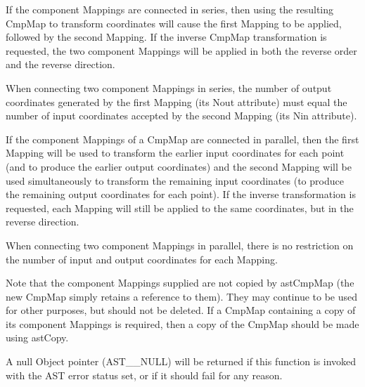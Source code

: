 \documentclass[twoside,11pt]{article}
\newcommand{\htmlref}[2]{#1}
\begin{document}
{{{         \sstitem
         If the component Mappings are connected in series, then using
         the resulting CmpMap to transform coordinates will cause the
         first Mapping to be applied, followed by the second Mapping. If
         the inverse CmpMap transformation is requested, the two
         component Mappings will be applied in both the reverse order and
         the reverse direction.

         \sstitem
         When connecting two component Mappings in series, the number
         of output coordinates generated by the first Mapping (its \htmlref{Nout}{Nout}
         attribute) must equal the number of input coordinates accepted
         by the second Mapping (its \htmlref{Nin}{Nin} attribute).

         \sstitem
         If the component Mappings of a CmpMap are connected in
         parallel, then the first Mapping will be used to transform the
         earlier input coordinates for each point (and to produce the
         earlier output coordinates) and the second Mapping will be used
         simultaneously to transform the remaining input coordinates (to
         produce the remaining output coordinates for each point). If the
         inverse transformation is requested, each Mapping will still be
         applied to the same coordinates, but in the reverse direction.

         \sstitem
         When connecting two component Mappings in parallel, there is
         no restriction on the number of input and output coordinates for
         each Mapping.

         \sstitem
         Note that the component Mappings supplied are not copied by
         astCmpMap (the new CmpMap simply retains a reference to
         them). They may continue to be used for other purposes, but
         should not be deleted. If a CmpMap containing a copy of its
         component Mappings is required, then a copy of the CmpMap should
         be made using \htmlref{astCopy}{astCopy}.

         \sstitem
         A null \htmlref{Object}{Object} pointer (AST\_\_NULL) will be returned if this
         function is invoked with the AST error status set, or if it
         should fail for any reason.
      }
   }
}
\end{document}
